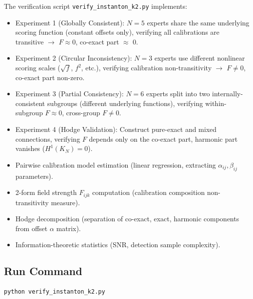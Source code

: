 \documentclass[12pt,a4paper]{article}
\theoremstyle{plain}
\theoremstyle{definition}
\theoremstyle{remark}
\begin{document}
The verification script \texttt{verify\_instanton\_k2.py} implements:
\begin{itemize}
    \item Experiment 1 (Globally Consistent): $N=5$ experts share the same underlying scoring function (constant offsets only), verifying all calibrations are transitive $\rightarrow$ $F \approx 0$, co-exact part $\approx$ 0.
    \item Experiment 2 (Circular Inconsistency): $N=3$ experts use different nonlinear scoring scales ($\sqrt{f}$, $f^2$, etc.), verifying calibration non-transitivity $\rightarrow$ $F \neq 0$, co-exact part non-zero.
    \item Experiment 3 (Partial Consistency): $N=6$ experts split into two internally-consistent subgroups (different underlying functions), verifying within-subgroup $F \approx 0$, cross-group $F \neq 0$.
    \item Experiment 4 (Hodge Validation): Construct pure-exact and mixed connections, verifying $F$ depends only on the co-exact part, harmonic part vanishes ($H^1(K_N)=0$).
    \item Pairwise calibration model estimation (linear regression, extracting $\alpha_{ij}, \beta_{ij}$ parameters).
    \item 2-form field strength $F_{ijk}$ computation (calibration composition non-transitivity measure).
    \item Hodge decomposition (separation of co-exact, exact, harmonic components from offset $\alpha$ matrix).
    \item Information-theoretic statistics (SNR, detection sample complexity).
\end{itemize}

\subsection{Run Command}
\begin{verbatim}
python verify_instanton_k2.py
\end{verbatim}
\end{document}
